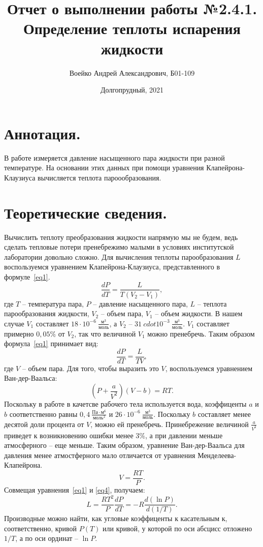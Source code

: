 \documentclass[a4paper,11pt]{article}
\title{Отчет о выполнении работы №2.4.1.\\Определение теплоты испарения жидкости}
\author{Воейко Андрей Александрович, Б01-109}
\date{Долгопрудный, 2021}
\begin{document}
\maketitle
\newpage
\section{Аннотация.}
В работе измеряется давление насыщенного пара жидкости при разной температуре. На основании этих данных при помощи уравнения Клапейрона-Клаузиуса вычисляется теплота пароообразования.
\section{Теоретические сведения.}
Вычислить теплоту преобразования жидкости напрямую мы не будем, ведь сделать тепловые потери пренебрежимо малыми в условиях институтской лаборатории довольно сложно. Для вычисления теплоты парообразования $L$ воспользуемся уравнением Клапейрона-Клаузиуса, представленного в формуле~\ref{eq1}.
\begin{equation}    \label{eq1}
  \frac{dP}{dT}=\frac{L}{T(V_{2}-V_{1})},
\end{equation}
где $T$ -- температура пара, $P$ -- давление насыщенного пара, $L$ -- теплота парообразования жидкости, $V_{2}$ -- объем пара, $V_{1}$ -- объем жидкости. В нашем случае $V_{1}$ составляет $18 \cdot 10^{-6}\ \frac{м^{3}}{моль}$, а $V_{2}$ -- $31 \ cdot 10^{-3}\ \frac{м^{3}}{моль}$. $V_{1}$ составляет примерно $0,05\%$ от $V_{2}$, так что величиной $V_{1}$ можно пренебречь. Таким образом формула~\ref{eq1} принимает вид:
\begin{equation}    \label{eq2}
  \frac{dP}{dT}=\frac{L}{TV},
\end{equation}
где $V$ -- объем пара. Для того, чтобы выразить это $V$, воспользуемся уравнением Ван-дер-Ваальса:
\begin{equation}    \label{eq3}
  (P + \frac{a}{V^{2}})(V-b)=RT.
\end{equation}
Поскольку в работе в качетсве рабочего тела используется вода, коэффиценты $a$ и $b$ соответственно равны $0,4\ \frac{Па \cdot м^{6}}{моль^{2}}$ и $26 \cdot 10^{-6}\ \frac{м^{3}}{моль}$. Поскольку $b$ составляет менее десятой доли процента от $V$, можно ей пренебречь. Принебрежение величиной $\frac{a}{V^{2}}$ приведет к возникновению ошибки менее $3\%$, а при давлении меньше атмосферного -- еще меньше. Таким образом, уравнение Ван-дер-Ваальса для давления менее атмостферного мало отличается от уравнения Менделеева-Клапейрона.
\begin{equation}    \label{eq4}
  V = \frac{RT}{P}.
\end{equation}
Совмещая уравнения~\ref{eq1} и \ref{eq4}, получаем:
\begin{equation}    \label{eq5}
  L = \frac{RT^{2}}{P} \frac{dP}{dT} = -R \frac{d(\ln P)}{d(1 / T)}.
\end{equation}
Производные можно найти, как угловые коэффиценты к касательным к, соответственно, кривой $P(T)$ или кривой, у которой по оси абсцисс отложено $1/T$, а по оси ординат -- $\ln P$.
\end{document}
